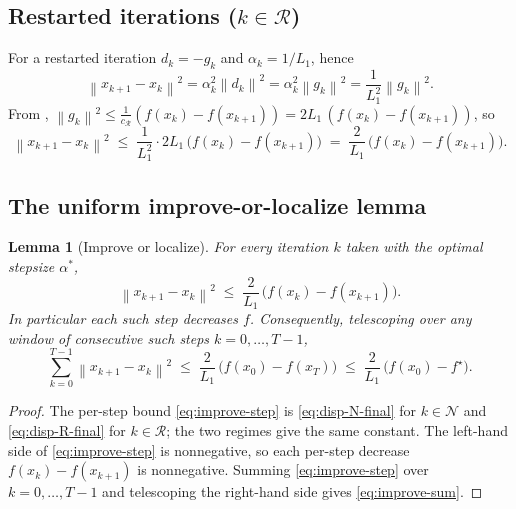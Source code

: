 \documentclass[11pt,a4paper]{article}
\theoremstyle{plain}
\newtheorem{lemma}{Lemma}
\theoremstyle{definition}
\newcommand{\norm}[1]{\left\|#1\right\|}
\newcommand{\fstar}{f^{\star}}
\newcommand{\Lone}{L_{1}}
\newcommand{\setN}{\mathcal{N}}
\newcommand{\setR}{\mathcal{R}}
\newcommand{\cR}{c_{\setR}}
\begin{document}
\subsection{Restarted iterations ($k \in \setR$)}\label{sub:improveR}
For a restarted iteration $d_{k} = -g_{k}$ and $\alpha_{k} = 1/\Lone$, hence
\begin{equation}\label{eq:disp-R}
\norm{x_{k+1} - x_{k}}^{2}
  = \alpha_{k}^{2}\norm{d_{k}}^{2}
  = \alpha_{k}^{2}\norm{g_{k}}^{2}
  = \frac{1}{\Lone^{2}}\norm{g_{k}}^{2} .
\end{equation}
From , $\norm{g_{k}}^{2} \leq \tfrac{1}{\cR}(f(x_{k}) - f(x_{k+1}))
= 2\Lone\,(f(x_{k}) - f(x_{k+1}))$, so
\begin{equation}\label{eq:disp-R-final}
\norm{x_{k+1} - x_{k}}^{2}
  \;\leq\; \frac{1}{\Lone^{2}} \cdot 2\Lone\,
           \big(f(x_{k}) - f(x_{k+1})\big)
  \;=\; \frac{2}{\Lone}\,\big(f(x_{k}) - f(x_{k+1})\big) .
\end{equation}

\subsection{The uniform improve-or-localize lemma}\label{sub:improve-uniform}

\begin{lemma}[Improve or localize]\label{lem:improve}
For every iteration $k$ taken with the optimal stepsize $\alpha^{\ast}$,
\begin{equation}\label{eq:improve-step}
\norm{x_{k+1} - x_{k}}^{2}
  \;\leq\; \frac{2}{\Lone}\,\big(f(x_{k}) - f(x_{k+1})\big) .
\end{equation}
In particular each such step decreases $f$. Consequently, telescoping over any window
of consecutive such steps $k = 0, \dots, T-1$,
\begin{equation}\label{eq:improve-sum}
\sum_{k=0}^{T-1} \norm{x_{k+1} - x_{k}}^{2}
  \;\leq\; \frac{2}{\Lone}\,\big(f(x_{0}) - f(x_{T})\big)
  \;\leq\; \frac{2}{\Lone}\,\big(f(x_{0}) - \fstar\big).
\end{equation}
\end{lemma}

\begin{proof}
The per-step bound \eqref{eq:improve-step} is \eqref{eq:disp-N-final} for
$k \in \setN$ and \eqref{eq:disp-R-final} for $k \in \setR$; the two regimes give the
same constant. The left-hand side of \eqref{eq:improve-step} is nonnegative, so each
per-step decrease $f(x_{k})-f(x_{k+1})$ is nonnegative. Summing
\eqref{eq:improve-step} over $k = 0,\dots,T-1$ and telescoping the right-hand side
gives \eqref{eq:improve-sum}.
\end{proof}
\end{document}
